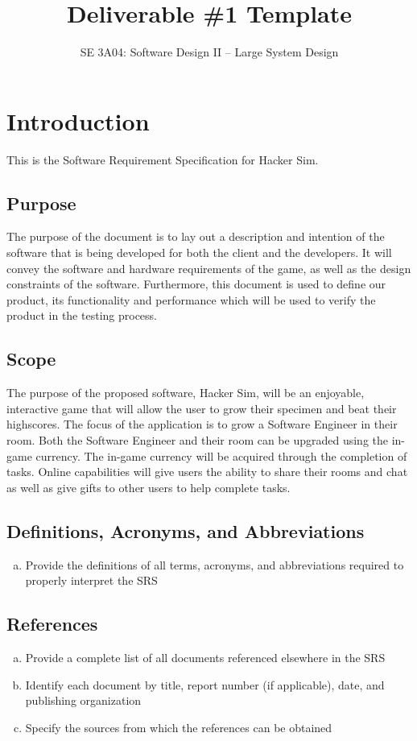 \documentclass[]{article}
\title{Deliverable \#1 Template}
\author{SE 3A04: Software Design II -- Large System Design}
\date{}
\begin{document}
\maketitle	

\section{Introduction}
\label{sec:introduction}
This is the Software Requirement Specification for Hacker Sim.

\subsection{Purpose}
\label{sub:purpose}
The purpose of the document is to lay out a description and intention of the 
software that is being developed for both the client and the developers. It 
will convey the software and hardware requirements of the game, as well as the 
design constraints of the software. Furthermore, this document is used to define 
our product, its functionality and performance which will be used to verify the 
product in the testing process. 

\subsection{Scope}
\label{sub:scope}
The purpose of the proposed software, Hacker Sim, will be an enjoyable, 
interactive game that will allow the user to grow their specimen and beat their 
highscores. The focus of the application is to grow a Software Engineer in their 
room. Both the Software Engineer and their room can be upgraded using the 
in-game currency. The in-game currency will be acquired through the completion 
of tasks. Online capabilities will give users the ability to share their rooms 
and chat as well as give gifts to other users to help complete tasks. 


\subsection{Definitions, Acronyms, and Abbreviations}
\label{sub:definitions_acronyms_and_abbreviations}
\begin{enumerate}[a)]
	\item Provide the definitions of all terms, acronyms, and abbreviations required to properly interpret the SRS
\end{enumerate}

\subsection{References}
\label{sub:references}
\begin{enumerate}[a)]
	\item Provide a complete list of all documents referenced elsewhere in the SRS
	\item Identify each document by title, report number (if applicable), date, and publishing organization
	\item Specify the sources from which the references can be obtained
\end{enumerate}
\end{document}
